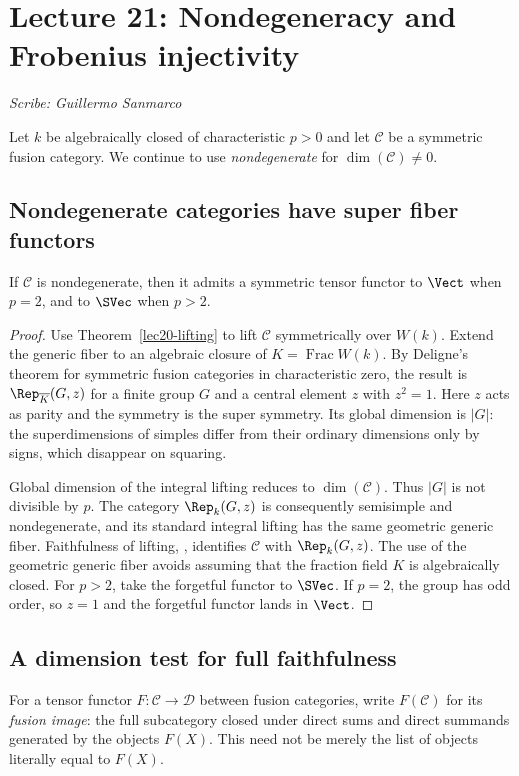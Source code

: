 \section{Lecture 21: Nondegeneracy and Frobenius injectivity}
\label{lec21}
\noindent\textit{Scribe: Guillermo Sanmarco}

Let $k$ be algebraically closed of characteristic $p>0$ and let
$\mathcal C$ be a symmetric fusion category. We continue to use
\emph{nondegenerate} for $\dim(\mathcal C)\ne0$.

\subsection{Nondegenerate categories have super fiber functors}
\begin{proposition}\label{lec21-nondegenerate-fiber}
If $\mathcal C$ is nondegenerate, then it admits a symmetric tensor functor
to $\Vect$ when $p=2$, and to $\SVec$ when $p>2$.
\end{proposition}
\begin{proof}
Use Theorem~\ref{lec20-lifting} to lift $\mathcal C$ symmetrically over
$W(k)$. Extend the generic fiber to an algebraic closure of
$K=\operatorname{Frac}W(k)$. By Deligne's theorem for symmetric fusion
categories in characteristic zero, the result is
$\Rep_{\overline K}(G,z)$ for a finite group $G$ and a central element
$z$ with $z^2=1$. Here $z$ acts as parity and the symmetry is the super
symmetry. Its global dimension is $|G|$: the superdimensions of simples
differ from their ordinary dimensions only by signs, which disappear on
squaring.

Global dimension of the integral lifting reduces to
$\dim(\mathcal C)$. Thus $|G|$ is not divisible by $p$.
The category $\Rep_k(G,z)$ is consequently semisimple and nondegenerate,
and its standard integral lifting has the same geometric generic fiber.
Faithfulness of lifting, \cite[Corollary 9.9]{ENO}, identifies
$\mathcal C$ with $\Rep_k(G,z)$. The use of the geometric generic fiber
avoids assuming that the fraction field $K$ is algebraically closed.
For $p>2$, take the forgetful functor to $\SVec$. If $p=2$, the group has
odd order, so $z=1$ and the forgetful functor lands in $\Vect$.
\end{proof}

\subsection{A dimension test for full faithfulness}
For a tensor functor $F:\mathcal C\to\mathcal D$ between fusion
categories, write $F(\mathcal C)$ for its \emph{fusion image}: the full
subcategory closed under direct sums and direct summands generated by the
objects $F(X)$. This need not be merely the list of objects literally
equal to $F(X)$.

